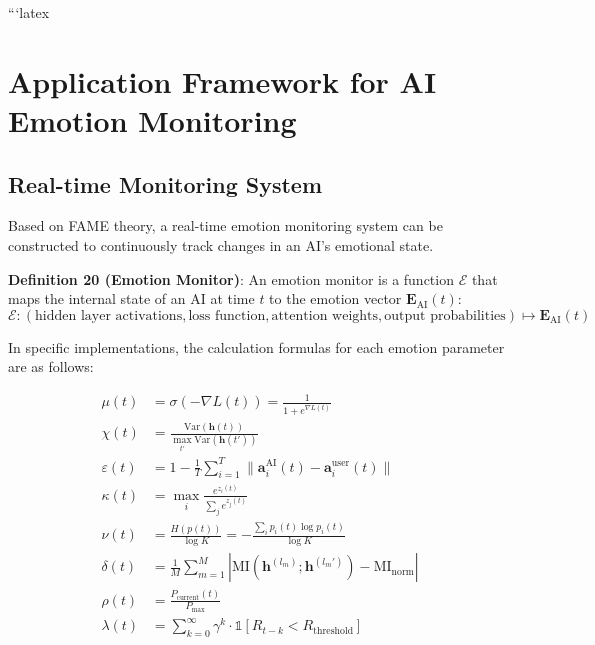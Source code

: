 \documentclass[12pt,a4paper]{article}
\theoremstyle{plain}
\newcommand{\ve}[1]{\bm{#1}}                    %
\newcommand{\Evec}{\ve{E}}                        %
\newcommand{\ind}{\mathds{1}}
\begin{document}
```latex
\section{Application Framework for AI Emotion Monitoring}

\subsection{Real-time Monitoring System}

Based on FAME theory, a real-time emotion monitoring system can be constructed to continuously track changes in an AI's emotional state.

\textbf{Definition 20 (Emotion Monitor)}: An emotion monitor is a function $\mathcal{E}$ that maps the internal state of an AI at time $t$ to the emotion vector $\Evec_{\text{AI}}(t)$:
\begin{equation}
\mathcal{E}: (\text{hidden layer activations}, \text{loss function}, \text{attention weights}, \text{output probabilities}) \mapsto \Evec_{\text{AI}}(t)
\label{eq:monitor}
\end{equation}

In specific implementations, the calculation formulas for each emotion parameter are as follows:

\begin{align}
\mu(t) &= \sigma(-\nabla L(t)) = \frac{1}{1 + e^{\nabla L(t)}} \label{eq:mu_monitor}\\
\chi(t) &= \frac{\text{Var}(\mathbf{h}(t))}{\max_{t'} \text{Var}(\mathbf{h}(t'))} \label{eq:chi_monitor}\\
\varepsilon(t) &= 1 - \frac{1}{T}\sum_{i=1}^T \| \mathbf{a}_i^{\text{AI}}(t) - \mathbf{a}_i^{\text{user}}(t) \| \label{eq:eps_monitor}\\
\kappa(t) &= \max_i \frac{e^{z_i(t)}}{\sum_j e^{z_j(t)}} \label{eq:kappa_monitor}\\
\nu(t) &= \frac{H(p(t))}{\log K} = -\frac{\sum_i p_i(t) \log p_i(t)}{\log K} \label{eq:nu_monitor}\\
\delta(t) &= \frac{1}{M}\sum_{m=1}^M |\text{MI}(\mathbf{h}^{(l_m)}; \mathbf{h}^{(l_m')}) - \text{MI}_{\text{norm}}| \label{eq:delta_monitor}\\
\rho(t) &= \frac{P_{\text{current}}(t)}{P_{\text{max}}} \label{eq:rho_monitor}\\
\lambda(t) &= \sum_{k=0}^{\infty} \gamma^k \cdot \ind[R_{t-k} < R_{\text{threshold}}] \label{eq:lambda_monitor}
\end{align}
\end{document}
